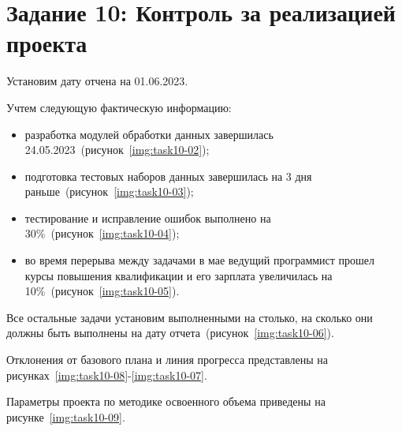 \section{Задание 10: Контроль за реализацией проекта}

Установим дату отчена на 01.06.2023.


Учтем следующую фактическую информацию:

\begin{itemize}
    \item разработка модулей обработки данных завершилась
        24.05.2023~(рисунок~\ref{img:task10-02});


    \item подготовка тестовых наборов данных завершилась на 3 дня
        раньше~(рисунок~\ref{img:task10-03});


    \item тестирование и исправление ошибок выполнено на
        30\%~(рисунок~\ref{img:task10-04});


    \item во время перерыва между задачами в мае ведущий программист прошел
        курсы повышения квалификации и его зарплата увеличилась на
        10\%~(рисунок~\ref{img:task10-05}).

\end{itemize}

Все остальные задачи установим выполненными на столько, на сколько они должны
быть выполнены на дату отчета~(рисунок~\ref{img:task10-06}).


Отклонения от базового плана и линия прогресса представлены на
рисунках~\ref{img:task10-08}-\ref{img:task10-07}. 



Параметры проекта по методике освоенного объема приведены на
рисунке~\ref{img:task10-09}.

